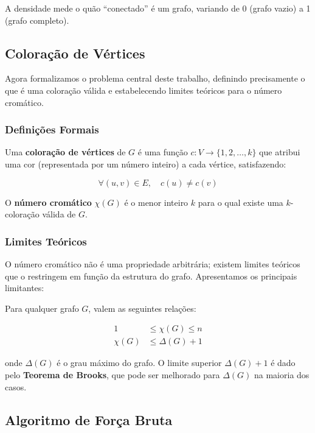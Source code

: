 \documentclass[12pt]{article}
\begin{document}
A densidade mede o quão ``conectado'' é um grafo, variando de 0 (grafo vazio) a 1 (grafo completo).

\subsection{Coloração de Vértices}

Agora formalizamos o problema central deste trabalho, definindo precisamente o que é uma coloração válida e estabelecendo limites teóricos para o número cromático.

\subsubsection{Definições Formais}

Uma \textbf{coloração de vértices} de $G$ é uma função $c: V \to \{1, 2, \ldots, k\}$ que atribui uma cor (representada por um número inteiro) a cada vértice, satisfazendo:

\begin{equation}
    \forall (u,v) \in E, \quad c(u) \neq c(v)
\end{equation}

O \textbf{número cromático} $\chi(G)$ é o menor inteiro $k$ para o qual existe uma $k$-coloração válida de $G$. 

\subsubsection{Limites Teóricos}

O número cromático não é uma propriedade arbitrária; existem limites teóricos que o restringem em função da estrutura do grafo. Apresentamos os principais limitantes:

Para qualquer grafo $G$, valem as seguintes relações:

\begin{align}
    1 &\leq \chi(G) \leq n \\
    \chi(G) &\leq \Delta(G) + 1
\end{align}

onde $\Delta(G)$ é o grau máximo do grafo. O limite superior $\Delta(G) + 1$ é dado pelo \textbf{Teorema de Brooks}, que pode ser melhorado para $\Delta(G)$ na maioria dos casos.

\subsection{Algoritmo de Força Bruta}
\end{document}
